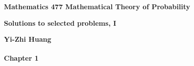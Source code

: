 
\newcommand{\SECT}[1]
		{\vspace{.3cm}
		$\!\!\!\!\!\!\!\!\!\!\!${\bf {#1}}
		\vspace{.2cm}}




\begin{center}
	 {\bf Mathematics 477 \hspace{1em} Mathematical Theory of Probability
\par} 
\vspace{.5cm}

{\large \sc \bf Solutions to selected problems, I\par}
\vspace{.5cm}
{{\bf Yi-Zhi Huang} 
\par}
\end{center}

\paragraph{Chapter 1}

